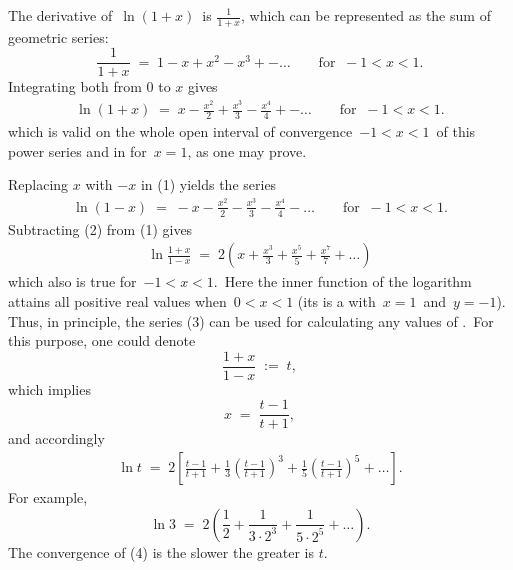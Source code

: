 \documentclass[12pt]{article}
\theoremstyle{definition}
\begin{document}
The derivative of\, $\ln(1\!+\!x)$\, is $\displaystyle\frac{1}{1\!+\!x}$, which can be represented as the sum of geometric series:
$$\frac{1}{1\!+\!x} \;=\; 1-x+x^2-x^3+-\ldots \qquad\mbox{for}\;\; -1 < x < 1.$$
Integrating both  from 0 to $x$ gives
\begin{align}
\ln(1\!+\!x) \;=\; x-\frac{x^2}{2}+\frac{x^3}{3}-\frac{x^4}{4}+-\ldots \qquad\mbox{for}\;\; -1 < x < 1.
\end{align}
which is valid on the whole open interval of convergence \,$-1 < x < 1$\, of this power series and in 
 for\, $x = 1$, as one may prove.

Replacing $x$ with $-x$ in (1) yields the series
\begin{align}
\ln(1\!-\!x) \;=\; -x-\frac{x^2}{2}-\frac{x^3}{3}-\frac{x^4}{4}-\ldots \qquad\mbox{for}\;\; -1 < x < 1.
\end{align}
Subtracting (2) from (1) gives
\begin{align}
\ln\frac{1\!+\!x}{1\!-\!x} \;=\; 2\left(x+\frac{x^3}{3}+\frac{x^5}{5}+\frac{x^7}{7}+\ldots\right)
\end{align}
which also is true for\, $-1 < x < 1$.\, Here the inner function of the logarithm attains all positive real values when\, $0 < x < 1$ (its  is a  with  \,$x = 1$\, and\, $y = -1$).\, Thus, in principle, the series (3) can be used for calculating any values of .\, For this purpose, one could denote
$$\frac{1\!+\!x}{1\!-\!x} \;:=\; t,$$
which implies
$$x \;=\;\frac{t\!-\!1}{t\!+\!1},$$
and accordingly
\begin{align}
\ln{t} \;=\; 2\left[\frac{t\!-\!1}{t\!+\!1}
            +\frac{1}{3}\left(\frac{t\!-\!1}{t\!+\!1}\right)^3
            +\frac{1}{5}\left(\frac{t\!-\!1}{t\!+\!1}\right)^5+\ldots\right]\!.
\end{align}
For example, 
$$\ln{3} \;=\; 2\left(\frac{1}{2}+\frac{1}{3\cdot2^3}+\frac{1}{5\cdot2^5}+\ldots\right)\!.$$
The convergence of (4) is the slower the greater is $t$.



\end{document}
